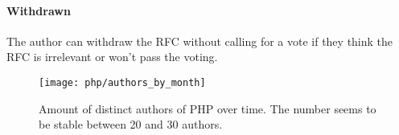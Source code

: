 \paragraph{Withdrawn}

The author can withdraw the \ac{RFC} without calling for a vote if they think
the \ac{RFC} is irrelevant or won't pass the voting.

\begin{figure}[htbp]
  \centering
  \texttt{[image: php/authors\_by\_month]}
  \caption[Authors by Month, PHP]
  {Amount of distinct authors of PHP over time. The number seems to be stable
    between 20 and 30 authors.}
\end{figure}


